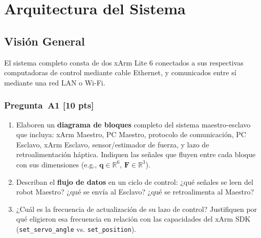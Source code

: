 \documentclass[journal,10pt,twoside]{IEEEtran}
\newcommand{\pts}[1]{\textbf{\color{tec_red}[#1 pts]}}
\begin{document}
\section{Arquitectura del Sistema}
\label{sec:architecture}

\subsection{Visión General}

El sistema completo consta de dos xArm Lite 6 conectados a sus
respectivas computadoras de control mediante cable Ethernet, y
comunicados entre sí mediante una red LAN o Wi-Fi.

\subsubsection*{Pregunta~A1 \pts{10}}
\begin{enumerate}[label=(\alph*)]
  \item Elaboren un \textbf{diagrama de bloques} completo del sistema
        maestro-esclavo que incluya: xArm Maestro, PC Maestro,
        protocolo de comunicación, PC Esclavo, xArm Esclavo,
        sensor/estimador de fuerza, y lazo de retroalimentación háptica.
        Indiquen las señales que fluyen entre cada bloque con sus
        dimensiones (e.g., $\bm{q}\in\mathbb{R}^6$, $\bm{F}\in\mathbb{R}^3$).
  \item Describan el \textbf{flujo de datos} en un ciclo de control:
        ¿qué señales se leen del robot Maestro? ¿qué se envía al Esclavo?
        ¿qué se retroalimenta al Maestro?
  \item ¿Cuál es la frecuencia de actualización de su lazo de control?
        Justifiquen por qué eligieron esa frecuencia en relación con
        las capacidades del xArm SDK (\texttt{set\_servo\_angle} vs.
        \texttt{set\_position}).
\end{enumerate}
\end{document}
